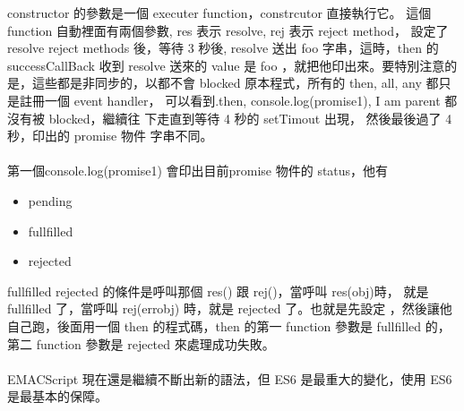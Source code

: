   constructor 的參數是一個 executer function，constrcutor 直接執行它。 這個
  function 自動裡面有兩個參數, res 表示 resolve, rej 表示 reject method，
  設定了 resolve reject methods 後，等待 3 秒後,
  resolve 送出 foo 字串，這時，then 的 successCallBack 收到 resolve 送來的
  value 是 foo ，就把他印出來。要特別注意的是，這些都是非同步的，以都不會
  blocked 原本程式，所有的 then, all, any 都只是註冊一個 event handler，
  可以看到.then, console.log(promise1), I am parent 都沒有被 blocked，繼續往
  下走直到等待 4 秒的 setTimout 出現， 然後最後過了 4 秒，印出的 promise 物件
  字串不同。
  \\\\
  第一個console.log(promise1) 會印出目前promise 物件的 status，他有
  \begin{itemize}
    \item pending
    \item fullfilled
    \item rejected
  \end{itemize}
  fullfilled rejected 的條件是呼叫那個 res() 跟 rej()，當呼叫 res(obj)時，
  就是 fullfilled 了，當呼叫 rej(errobj) 時，就是 rejected 了。也就是先設定
  ，然後讓他自己跑，後面用一個 then 的程式碼，then 的第一 function 參數是
  fullfilled 的，第二 function 參數是 rejected 來處理成功失敗。
  \\\\
  EMACScript 現在還是繼續不斷出新的語法，但 ES6 是最重大的變化，使用 ES6
  是最基本的保障。
